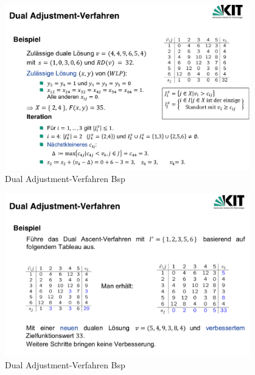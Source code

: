       \begin{figure}[H]
        \centering
        \includegraphics[width=0.95\textwidth]{Images/Dual_Adjustment_Verfahren_Bsp(1).png}
        \caption{Dual Adjustment-Verfahren Bsp}
        \label{fig:Dual_Adjustment_Verfahren}
      \end{figure}

      \begin{figure}[H]
        \centering
        \includegraphics[width=0.95\textwidth]{Images/Dual_Adjustment_Verfahren_Bsp(2).png}
        \caption{Dual Adjustment-Verfahren Bsp}
        \label{fig:Dual_Adjustment_Verfahren}
      \end{figure}

